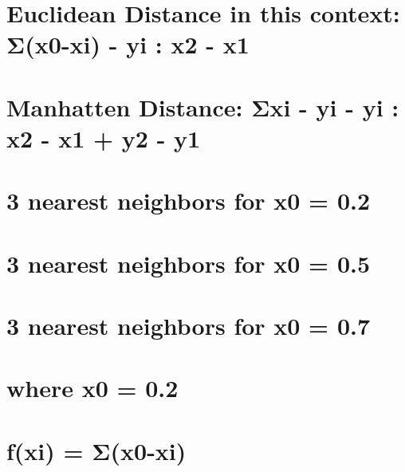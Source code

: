 \documentclass[
  letterpaper,
  DIV=11,
  numbers=noendperiod]{scrreprt}
\begin{document}
{

\chapter{Euclidean Distance in this context: Σ(x0-xi) - yi : \textbar x2
-
x1\textbar{}}\label{euclidean-distance-in-this-context-ux3c3x0-xi---yi-x2---x1}


\chapter{Manhatten Distance: Σ\textbar xi - yi\textbar{} - yi :
\textbar x2 - x1\textbar{} + \textbar y2 -
y1\textbar{}}\label{manhatten-distance-ux3c3xi---yi---yi-x2---x1-y2---y1}


\chapter{3 nearest neighbors for x0 =
0.2}\label{nearest-neighbors-for-x0-0.2}


\chapter{3 nearest neighbors for x0 =
0.5}\label{nearest-neighbors-for-x0-0.5}


\chapter{3 nearest neighbors for x0 =
0.7}\label{nearest-neighbors-for-x0-0.7}


\chapter{where x0 = 0.2}\label{where-x0-0.2}


\chapter{f(xi) = Σ(x0-xi)}\label{fxi-ux3c3x0-xi}


}
\end{document}
